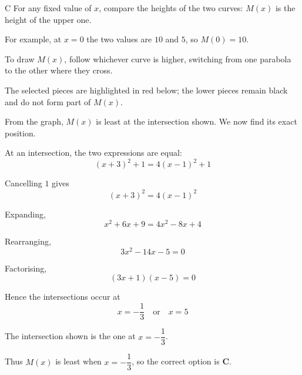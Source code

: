 \documentclass[11pt,a4paper]{article}
\begin{document}
\begin{enumerate}[label=\textbf{\arabic*.},leftmargin=*,itemsep=0pt,start=14]
\begin{djsSolution}{C}
For any fixed value of $x$, compare the heights of the two curves: $M(x)$ is the height of the upper one. 

For example, at $x=0$ the two values are $10$ and $5$, so $M(0)=10$.

To draw $M(x)$, follow whichever curve is higher, switching from one parabola to the other where they cross. 

The selected pieces are highlighted in red below; the lower pieces remain black and do not form part of $M(x)$.

\begin{djsSolutionFigure}
\end{djsSolutionFigure}

From the graph, $M(x)$ is least at the intersection shown. We now find its exact position.

At an intersection, the two expressions are equal:
\[
(x+3)^2+1=4(x-1)^2+1
\]

Cancelling $1$ gives
\[
(x+3)^2=4(x-1)^2
\]

Expanding,
\[
x^2+6x+9=4x^2-8x+4
\]

Rearranging,
\[
3x^2-14x-5=0
\]

Factorising,
\[
(3x+1)(x-5)=0
\]

Hence the intersections occur at
\[
x=-\frac13\quad\text{or}\quad x=5
\]

The intersection shown is the one at $x=-\dfrac13$. 

Thus $M(x)$ is least when $x=-\dfrac13$, so the correct option is \textbf{C}.
\end{djsSolution}
\end{enumerate}
\clearpage
\thispagestyle{djssolutions}
\end{document}
